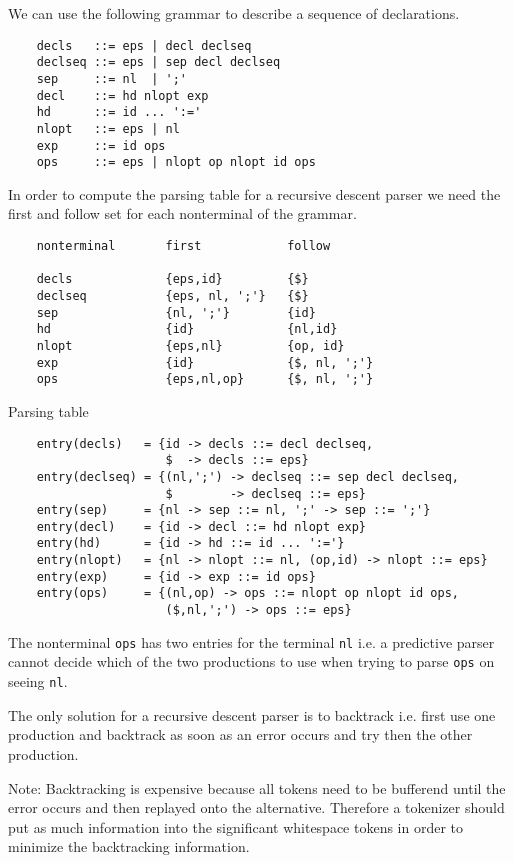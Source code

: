 We can use the following grammar to describe a sequence of declarations.
{\scriptsize
\begin{verbatim}
    decls   ::= eps | decl declseq
    declseq ::= eps | sep decl declseq
    sep     ::= nl  | ';'
    decl    ::= hd nlopt exp
    hd      ::= id ... ':='
    nlopt   ::= eps | nl
    exp     ::= id ops
    ops     ::= eps | nlopt op nlopt id ops
\end{verbatim}
}
%
In order to compute the parsing table for a recursive descent parser we need
the first and follow set for each nonterminal of the grammar.
{\scriptsize
\begin{verbatim}
    nonterminal       first            follow

    decls             {eps,id}         {$}
    declseq           {eps, nl, ';'}   {$}
    sep               {nl, ';'}        {id}
    hd                {id}             {nl,id}
    nlopt             {eps,nl}         {op, id}
    exp               {id}             {$, nl, ';'}
    ops               {eps,nl,op}      {$, nl, ';'}
\end{verbatim}
}
%
Parsing table
{\scriptsize
\begin{verbatim}
    entry(decls)   = {id -> decls ::= decl declseq,
                      $  -> decls ::= eps}
    entry(declseq) = {(nl,';') -> declseq ::= sep decl declseq,
                      $        -> declseq ::= eps}
    entry(sep)     = {nl -> sep ::= nl, ';' -> sep ::= ';'}
    entry(decl)    = {id -> decl ::= hd nlopt exp}
    entry(hd)      = {id -> hd ::= id ... ':='}
    entry(nlopt)   = {nl -> nlopt ::= nl, (op,id) -> nlopt ::= eps}
    entry(exp)     = {id -> exp ::= id ops}
    entry(ops)     = {(nl,op) -> ops ::= nlopt op nlopt id ops,
                      ($,nl,';') -> ops ::= eps}
\end{verbatim}
}
%
The nonterminal \verb!ops! has two entries for the terminal \verb!nl! i.e. a
predictive parser cannot decide which of the two productions to use when
trying to parse \verb!ops! on seeing \verb!nl!.

The only solution for a recursive descent parser is to backtrack i.e. first
use one production and backtrack as soon as an error occurs and try then the
other production.

Note: Backtracking is expensive because all tokens need to be bufferend until
the error occurs and then replayed onto the alternative. Therefore a tokenizer
should put as much information into the significant whitespace tokens in order
to minimize the backtracking information.


